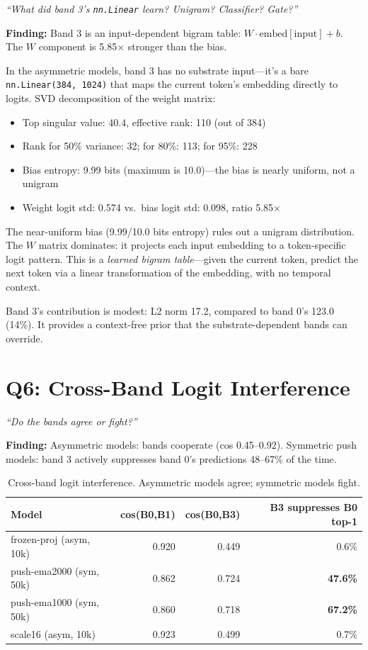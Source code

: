 \documentclass[11pt,a4paper]{report}
\newcommand{\cq}[1]{\textcolor{q}{\textit{``#1''}}}
\newcommand{\finding}[1]{\textcolor{finding}{\textbf{Finding:}} #1}
\begin{document}
\cq{What did band 3's \texttt{nn.Linear} learn? Unigram? Classifier? Gate?}

\finding{Band 3 is an input-dependent bigram table: $W \cdot \text{embed}[\text{input}] + b$. The $W$ component is 5.85$\times$ stronger than the bias.}

In the asymmetric models, band 3 has no substrate input---it's a bare \texttt{nn.Linear(384, 1024)} that maps the current token's embedding directly to logits. SVD decomposition of the weight matrix:

\begin{itemize}[nosep]
\item Top singular value: 40.4, effective rank: 110 (out of 384)
\item Rank for 50\% variance: 32; for 80\%: 113; for 95\%: 228
\item Bias entropy: 9.99 bits (maximum is 10.0)---the bias is nearly uniform, not a unigram
\item Weight logit std: 0.574 vs.\ bias logit std: 0.098, ratio 5.85$\times$
\end{itemize}

The near-uniform bias (9.99/10.0 bits entropy) rules out a unigram distribution. The $W$ matrix dominates: it projects each input embedding to a token-specific logit pattern. This is a \emph{learned bigram table}---given the current token, predict the next token via a linear transformation of the embedding, with no temporal context.

Band 3's contribution is modest: L2 norm 17.2, compared to band 0's 123.0 (14\%). It provides a context-free prior that the substrate-dependent bands can override.


\section{Q6: Cross-Band Logit Interference}

\cq{Do the bands agree or fight?}

\finding{Asymmetric models: bands cooperate (cos 0.45--0.92). Symmetric push models: band 3 actively suppresses band 0's predictions 48--67\% of the time.}

\begin{table}[h]
\centering
\begin{tabular}{lrrr}
\toprule
\textbf{Model} & \textbf{cos(B0,B1)} & \textbf{cos(B0,B3)} & \textbf{B3 suppresses B0 top-1} \\
\midrule
frozen-proj (asym, 10k) & 0.920 & 0.449 & 0.6\% \\
push-ema2000 (sym, 50k) & 0.862 & 0.724 & \textbf{47.6\%} \\
push-ema1000 (sym, 50k) & 0.860 & 0.718 & \textbf{67.2\%} \\
scale16 (asym, 10k) & 0.923 & 0.499 & 0.7\% \\
\bottomrule
\end{tabular}
\caption{Cross-band logit interference. Asymmetric models agree; symmetric models fight.}
\label{tab:cross_band}
\end{table}
\end{document}

